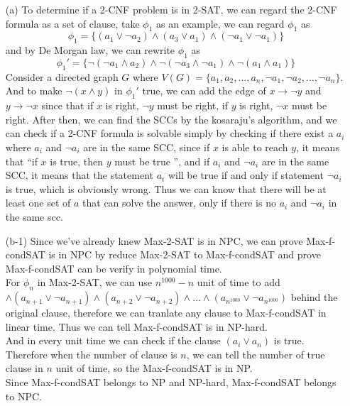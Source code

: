 \documentclass{homework}
\begin{document}
\begin{itemize}
    \item[(a)]
    To determine if a 2-CNF problem is in 2-SAT, we can regard the 2-CNF formula as a set of clause, take $\phi_1$ as an example, we can regard $\phi_1$ as 
    \[\phi_1 = \{(a_1\vee \lnot a_2)\wedge (a_3 \vee a_1)\wedge (\lnot a_1 \vee \lnot a_1)\}\] 
    and by De Morgan law, we can rewrite $\phi_1$ as 
    \[\phi_1 ' = \{\lnot(\lnot a_1 \wedge  a_2)\wedge \lnot(\lnot a_3 \wedge \lnot a_1)\wedge \lnot(a_1 \wedge a_1)\}\]
    Consider a directed graph $G$ where $V(G) = \{a_1, a_2,\ldots,a_n, \lnot a_1, \lnot a_2,\ldots,\lnot a_n\}$. And to make $\lnot(x \wedge y)$ in $\phi_1'$ true, we can add the edge of $x \rightarrow \lnot y$ and $y \rightarrow \lnot x$ since that if $x$ is right, $\lnot y$ must be right, if  $y$ is right, $\lnot x$ must be right.
    After then, we can find the SCCs by the kosaraju's algorithm, and we can check if a 2-CNF formula is solvable simply by checking if there exist a $a_i$ where $a_i$ and $\lnot a_i$ are in the same SCC, since if $x$ is able to reach $y$, it means that ``if $x$ is true, then $y$ must be true '', and if $a_i$ and $\lnot a_i$ are in the same SCC, it means that the statement $a_i$ will be true if and only if statement $\lnot a_i$ is true, which is obviously wrong. Thus we can know that there will be at least one set of $a$ that can solve the answer, only if there is no $a_i$ and $\lnot a_i$ in the same scc.

    \item[(b-1)]
    Since we've already knew Max-2-SAT is in NPC, we can prove Max-f-condSAT is in NPC by reduce Max-2-SAT to Max-f-condSAT and prove Max-f-condSAT can be verify in polynomial time.\\
    For $\phi_n$ in Max-2-SAT, we can use $n^{1000}-n$ unit of time to add $\wedge (a_{n+1} \vee \lnot a_{n+1})\wedge (a_{n+2} \vee \lnot a_{n+2})\wedge \ldots \wedge (a_{n^{1000}} \vee \lnot a_{n^{1000}})$ behind the original clause, therefore we can tranlate any clause to Max-f-condSAT in linear time. Thus we can tell Max-f-condSAT is in NP-hard.\\
    And in every unit time we can check if the clause $(a_i \vee a_n)$ is true. Therefore when the number of clause is $n$, we can tell the number of true clause in $n$ unit of time, so the Max-f-condSAT is in NP.\\
    Since Max-f-condSAT belongs to NP and NP-hard, Max-f-condSAT belongs to NPC.\\


\end{itemize}
\end{document}
